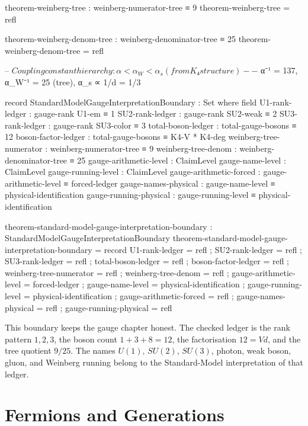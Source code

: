\documentclass[11pt,a4paper]{book}
\begin{document}
\begin{code}
theorem-weinberg-tree : weinberg-numerator-tree ≡ 9
theorem-weinberg-tree = refl

theorem-weinberg-denom-tree : weinberg-denominator-tree ≡ 25
theorem-weinberg-denom-tree = refl

-- $ Coupling constant hierarchy: α < α_W < α_s (from K₄ structure)
-- $ α⁻¹ = 137, α_W⁻¹ = 25 (tree), α_s ∝ 1/d = 1/3

record StandardModelGaugeInterpretationBoundary : Set where
  field
    U1-rank-ledger          : gauge-rank U1-em ≡ 1
    SU2-rank-ledger         : gauge-rank SU2-weak ≡ 2
    SU3-rank-ledger         : gauge-rank SU3-color ≡ 3
    total-boson-ledger      : total-gauge-bosons ≡ 12
    boson-factor-ledger     : total-gauge-bosons ≡ K4-V * K4-deg
    weinberg-tree-numerator : weinberg-numerator-tree ≡ 9
    weinberg-tree-denom     : weinberg-denominator-tree ≡ 25
    gauge-arithmetic-level  : ClaimLevel
    gauge-name-level        : ClaimLevel
    gauge-running-level     : ClaimLevel
    gauge-arithmetic-forced : gauge-arithmetic-level ≡ forced-ledger
    gauge-names-physical    : gauge-name-level ≡ physical-identification
    gauge-running-physical  : gauge-running-level ≡ physical-identification

theorem-standard-model-gauge-interpretation-boundary : StandardModelGaugeInterpretationBoundary
theorem-standard-model-gauge-interpretation-boundary = record
  { U1-rank-ledger          = refl
  ; SU2-rank-ledger         = refl
  ; SU3-rank-ledger         = refl
  ; total-boson-ledger      = refl
  ; boson-factor-ledger     = refl
  ; weinberg-tree-numerator = refl
  ; weinberg-tree-denom     = refl
  ; gauge-arithmetic-level  = forced-ledger
  ; gauge-name-level        = physical-identification
  ; gauge-running-level     = physical-identification
  ; gauge-arithmetic-forced = refl
  ; gauge-names-physical    = refl
  ; gauge-running-physical  = refl }
\end{code}

This boundary keeps the gauge chapter honest.  The checked ledger is the
rank pattern $1,2,3$, the boson count $1+3+8=12$, the factorisation
$12=Vd$, and the tree quotient $9/25$.  The names $U(1)$, $SU(2)$,
$SU(3)$, photon, weak boson, gluon, and Weinberg running belong to the
Standard-Model interpretation of that ledger.

\chapter{Fermions and Generations}
\label{ch:fermions}
\end{document}
